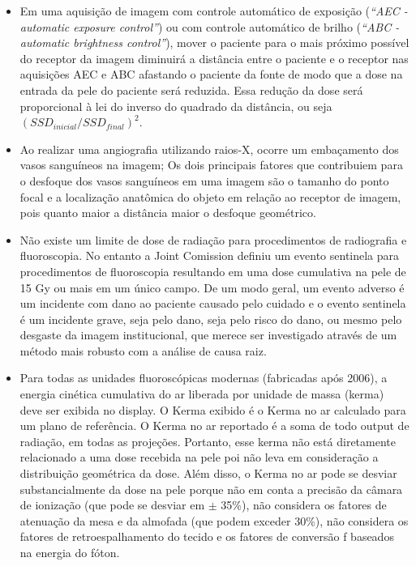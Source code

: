 \documentclass[11pt,a4paper]{article}
\newcounter{exemplo}
\begin{document}
\begin{exemplo}
\begin{itemize}
        \item Em uma aquisição de imagem com controle automático de exposição (\textit{``AEC - automatic exposure control''}) ou com controle automático de brilho (\textit{``ABC - automatic brightness control''}), mover o paciente para o mais próximo possível do receptor da imagem diminuirá a distância entre o paciente e o receptor nas aquisições AEC e ABC afastando o paciente da fonte de modo que a dose na entrada da pele do paciente será reduzida. Essa redução da dose será proporcional à lei do inverso do quadrado da distância, ou seja $(SSD_{inicial}/SSD_{final})^2$.
        
        \item Ao realizar uma angiografia utilizando raios-X, ocorre um embaçamento dos vasos sanguíneos na imagem; Os dois principais fatores que contribuiem para o desfoque dos vasos sanguíneos em uma imagem são o tamanho do ponto focal e a localização anatômica do objeto em relação ao receptor de imagem, pois quanto maior a distância maior o desfoque geométrico.
        
        \item Não existe um limite de dose de radiação para procedimentos de radiografia e fluoroscopia. No entanto a Joint Comission definiu um evento sentinela para procedimentos de fluoroscopia resultando em uma dose cumulativa na pele de 15 Gy ou mais em um único campo. De um modo geral, um evento adverso é um incidente com dano ao paciente causado pelo cuidado e o evento sentinela é um incidente grave, seja pelo dano, seja pelo risco do dano, ou mesmo pelo desgaste da imagem institucional, que merece ser investigado através de um método mais robusto com a análise de causa raiz.
        
        \item Para todas as unidades fluoroscópicas modernas (fabricadas após 2006), a energia cinética cumulativa do ar liberada por unidade de massa (kerma) deve ser exibida no display. O Kerma exibido é o Kerma no ar calculado para um plano de referência. O Kerma no ar reportado é a soma de todo output de radiação, em todas as projeções. Portanto, esse kerma não está diretamente relacionado a uma dose recebida na pele poi não leva em consideração a distribuição geométrica da dose. Além disso, o Kerma no ar pode se desviar substancialmente da dose na pele porque não em conta a precisão da câmara de ionização (que pode se desviar em $\pm$ 35\%), não considera os fatores de atenuação da mesa e da almofada (que podem exceder 30\%), não considera os fatores de retroespalhamento do tecido e os fatores de conversão f baseados na energia do fóton.
        

\end{itemize}
\end{exemplo}
\end{document}
